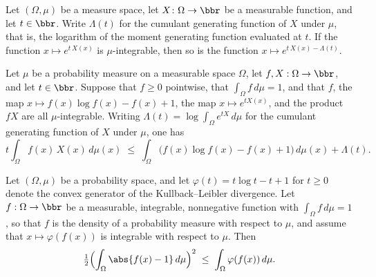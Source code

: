 \begin{theorem}
\label{CommunicationComplexity.integrable_exp_sub_cgf}
\leanok
{}
Let $(\Omega,\mu)$ be a measure space, let $X\colon\Omega\to\bbr$ be a measurable
function, and let $t\in\bbr$. Write $\Lambda(t)$ for the cumulant generating function of
$X$ under $\mu$, that is, the logarithm of the moment generating function evaluated at
$t$. If the function $x\mapsto e^{t\,X(x)}$ is $\mu$-integrable, then so is the function
$x\mapsto e^{t\,X(x)-\Lambda(t)}$.
\end{theorem}

\begin{theorem}
\label{CommunicationComplexity.variational_integral_mul_le_integral_klFun_add_cgf}
\leanok
{}
Let $\mu$ be a probability measure on a measurable space $\Omega$, let $f, X : \Omega
\to \bbr$, and let $t \in \bbr$. Suppose that $f \ge 0$ pointwise, that $\int_\Omega
f\,d\mu = 1$, and that $f$, the map $x \mapsto f(x)\log f(x) - f(x) + 1$, the map $x
\mapsto e^{tX(x)}$, and the product $fX$ are all $\mu$-integrable. Writing $\Lambda(t) =
\log \int_\Omega e^{tX}\,d\mu$ for the cumulant generating function of $X$ under $\mu$,
one has
\[
t \int_\Omega f(x)\,X(x)\,d\mu(x) \;\le\; \int_\Omega \bigl(f(x)\log f(x) - f(x) +
1\bigr)\,d\mu(x) + \Lambda(t).
\]
\end{theorem}

\begin{theorem}
\label{CommunicationComplexity.half_integral_abs_sub_one_sq_le_integral_klFun}
\leanok
{}
Let $(\Omega, \mu)$ be a probability space, and let $\varphi(t) = t \log t - t + 1$ for
$t \ge 0$ denote the convex generator of the Kullback–Leibler divergence. Let $f :
\Omega \to \bbr$ be a measurable, integrable, nonnegative function with $\int_\Omega f
\, d\mu = 1$, so that $f$ is the density of a probability measure with respect to $\mu$,
and assume that $x \mapsto \varphi(f(x))$ is integrable with respect to $\mu$. Then
\[
\tfrac{1}{2}\Bigl(\int_\Omega \abs{f(x) - 1}\, d\mu\Bigr)^{2} \;\le\; \int_\Omega
\varphi(f(x))\, d\mu .
\]
\end{theorem}

